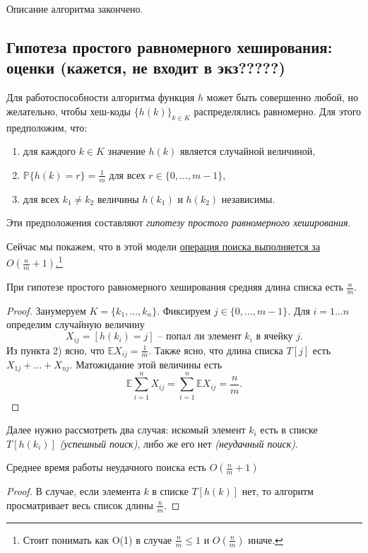 Описание алгоритма закончено.

\subsection{Гипотеза простого равномерного хеширования: оценки (кажется, не входит в экз?????)}

Для работоспособности алгоритма функция $h$ может быть совершенно любой, но желательно, чтобы хеш-коды $\{h(k)\}_{k\in K}$ распределялись равномерно. Для этого предположим, что:
\begin{enumerate}
    \item для каждого $k \in K$ значение $h(k)$ является случайной величиной,
    \item $\mathbb P\{h(k) = r\} = \frac{1}{m}$ для всех $r \in \{0, \ldots, m-1\}$,
    \item для всех $k_1 \neq k_2$ величины $h(k_1)$ и $h(k_2)$ независимы.
\end{enumerate}
Эти предположения составляют \textit{гипотезу простого равномерного хеширования}.

Сейчас мы покажем, что в этой модели \underline{операция поиска выполняется за $O\left(\frac{n}{m}+1\right)$.}\footnote{Стоит понимать как O(1) в случае $\frac{n}{m} \leq 1$ и $O\left(\frac{n}{m}\right)$ иначе.}

\begin{theorem*}
	При гипотезе простого равномерного хеширования средняя длина списка есть $\frac{n}{m}$.
\end{theorem*}
\begin{proof}
Занумеруем $K = \{k_1, \ldots, k_n\}$. Фиксируем $j \in \{0, \ldots, m-1\}$. Для $i=1\ldots n$ определим случайную величину
$$X_{ij} = [h(k_i)=j] \text{~-- попал ли элемент $k_i$ в ячейку $j$.}$$
Из пункта 2) ясно, что $\mathbb E X_{ij} = \frac{1}{m}$. Также ясно, что длина списка $T[j]$ есть $X_{1j}+\ldots+X_{nj}$. Матожидание этой величины есть $$\mathbb E \sum_{i=1}^n X_{ij} = \sum_{i=1}^n \mathbb E X_{ij} = \frac{n}{m}.$$
\end{proof}

Далее нужно рассмотреть два случая: искомый элемент $k_i$ есть в списке $T[h(k_i)]$ \textit{(успешный поиск)}, либо же его нет \textit{(неудачный поиск)}.

\begin{theorem*}
	Среднее время работы неудачного поиска есть $O\left(\frac{n}{m}+1\right)$
\end{theorem*}
\begin{proof}
В случае, если элемента $k$ в списке $T[h(k)]$ нет, то алгоритм просматривает весь список длины $\frac{n}{m}$.
\end{proof}

